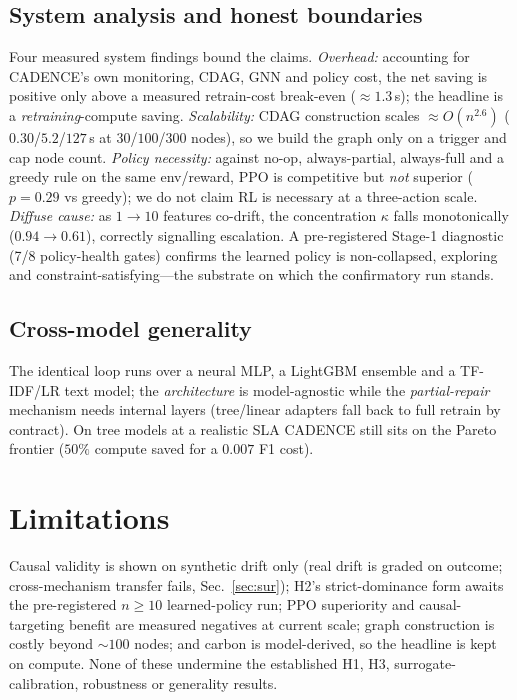 \documentclass[conference]{IEEEtran}
\begin{document}
\subsection{System analysis and honest boundaries}\label{sec:sys}
Four measured system findings bound the claims. \emph{Overhead:} accounting for
CADENCE's own monitoring, CDAG, GNN and policy cost, the net saving is positive
only above a measured retrain-cost break-even ($\approx1.3$\,s); the headline is
a \emph{retraining}-compute saving. \emph{Scalability:} CDAG construction scales
$\approx O(n^{2.6})$ ($0.30$/$5.2$/$127$\,s at $30$/$100$/$300$ nodes), so we
build the graph only on a trigger and cap node count. \emph{Policy necessity:}
against no-op, always-partial, always-full and a greedy rule on the same
env/reward, PPO is competitive but \emph{not} superior ($p{=}0.29$ vs greedy);
we do not claim RL is necessary at a three-action scale. \emph{Diffuse cause:}
as $1{\to}10$ features co-drift, the concentration $\kappa$ falls monotonically
($0.94{\to}0.61$), correctly signalling escalation. A pre-registered Stage-1
diagnostic (7/8 policy-health gates) confirms the learned policy is
non-collapsed, exploring and constraint-satisfying---the substrate on which the
confirmatory run stands.

\subsection{Cross-model generality}
The identical loop runs over a neural MLP, a LightGBM ensemble and a TF-IDF/LR
text model; the \emph{architecture} is model-agnostic while the
\emph{partial-repair} mechanism needs internal layers (tree/linear adapters fall
back to full retrain by contract). On tree models at a realistic SLA CADENCE
still sits on the Pareto frontier ($50\%$ compute saved for a $0.007$ F1 cost).

\section{Limitations}\label{sec:lim}
Causal validity is shown on synthetic drift only (real drift is graded on
outcome; cross-mechanism transfer fails, Sec.~\ref{sec:sur}); H2's
strict-dominance form awaits the pre-registered $n{\ge}10$ learned-policy run;
PPO superiority and causal-targeting benefit are measured negatives at current
scale; graph construction is costly beyond $\sim\!100$ nodes; and carbon is
model-derived, so the headline is kept on compute. None of these undermine the
established H1, H3, surrogate-calibration, robustness or generality results.
\end{document}
